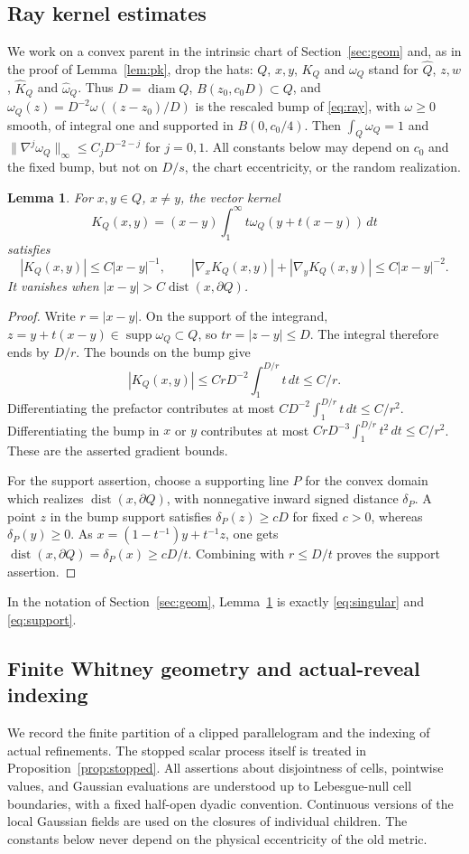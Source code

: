 \documentclass[11pt]{article}
\newtheorem{lemma}[lemma]{Lemma}
\theoremstyle{definition}
\theoremstyle{remark}
\numberwithin{equation}{section}
\newcommand{\diam}{\operatorname{diam}}
\begin{document}
\subsection{Ray kernel estimates}\label{app:kernelchain}
We work on a convex parent in the intrinsic chart of
Section~\ref{sec:geom} and, as in the proof of Lemma~\ref{lem:pk},
drop the hats: $Q$, $x,y$, $K_Q$ and $\omega_Q$ stand for
$\widehat Q$, $z,w$, $\widehat K_Q$ and $\widehat\omega_Q$. Thus
$D=\diam Q$, $B(z_0,c_0D)\subset Q$, and
$\omega_Q(z)=D^{-2}\omega((z-z_0)/D)$ is the rescaled bump of
\eqref{eq:ray}, with $\omega\ge0$ smooth, of integral one and
supported in $B(0,c_0/4)$. Then $\int_Q\omega_Q=1$ and
$\|\nabla^j\omega_Q\|_\infty\le C_jD^{-2-j}$ for $j=0,1$.
All constants below may depend on $c_0$ and the fixed bump, but not
on $D/s$, the chart eccentricity, or the random realization.

\begin{lemma}\label{lem:app-ray}
For $x,y\in Q$, $x\ne y$, the vector kernel
\[
 K_Q(x,y)=(x-y)\int_1^\infty t\omega_Q(y+t(x-y))\,dt
\]
satisfies
\[
 |K_Q(x,y)|\le C|x-y|^{-1},\qquad
 |\nabla_xK_Q(x,y)|+|\nabla_yK_Q(x,y)|
 \le C|x-y|^{-2}.
\]
It vanishes when $|x-y|>C\operatorname{dist}(x,\partial Q)$.
\end{lemma}
\begin{proof}
Write $r=|x-y|$. On the support of the integrand,
$z=y+t(x-y)\in\operatorname{supp}\omega_Q\subset Q$,
so $tr=|z-y|\le D$. The integral therefore ends by $D/r$.
The bounds on the bump give
\[
 |K_Q(x,y)|\le CrD^{-2}\int_1^{D/r}t\,dt\le C/r.
\]
Differentiating the prefactor contributes at most
$CD^{-2}\int_1^{D/r}t\,dt\le C/r^2$.
Differentiating the bump in $x$ or $y$ contributes at most
$CrD^{-3}\int_1^{D/r}t^2\,dt\le C/r^2$.
These are the asserted gradient bounds.

For the support assertion, choose a supporting line $P$ for the convex domain which realizes
$\operatorname{dist}(x,\partial Q)$, with nonnegative inward signed
distance $\delta_P$. A point $z$ in the bump support satisfies
$\delta_P(z)\ge cD$ for fixed $c>0$, whereas $\delta_P(y)\ge0$.
As $x=(1-t^{-1})y+t^{-1}z$, one gets
$\operatorname{dist}(x,\partial Q)=\delta_P(x)\ge cD/t$.
Combining with $r\le D/t$ proves the support assertion.
\end{proof}

In the notation of Section~\ref{sec:geom}, Lemma~\ref{lem:app-ray}
is exactly \eqref{eq:singular} and \eqref{eq:support}.

\subsection{Finite Whitney geometry and actual-reveal indexing}
\label{app:allbranches}
We record the finite partition of a clipped parallelogram and the
indexing of actual refinements. The stopped scalar process itself is
treated in Proposition~\ref{prop:stopped}.
All assertions about disjointness of cells, pointwise values, and
Gaussian evaluations are understood up to Lebesgue-null cell
boundaries, with a fixed half-open dyadic convention.  Continuous
versions of the local Gaussian fields are used on the closures of
individual children.  The constants below never depend on the
physical eccentricity of the old metric.
\end{document}
